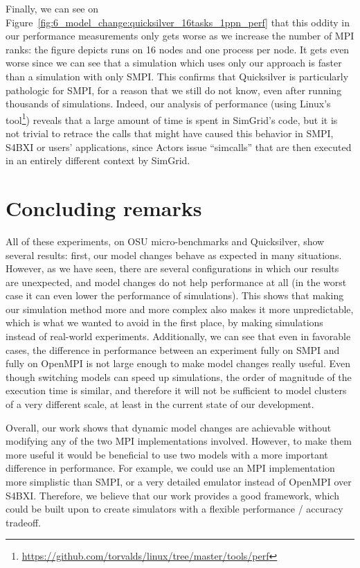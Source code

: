 Finally, we can see on
Figure~\ref{fig:6_model_change:quicksilver_16tasks_1ppn_perf} that this oddity
in our performance measurements only gets worse as we increase the number of MPI
ranks: the figure depicts runs on 16 nodes and one process per node. It gets
even worse since we can see that a simulation which uses only our approach is
faster than a simulation with only SMPI. This confirms that Quicksilver is
particularly pathologic for SMPI, for a reason that we still do not know, even
after running thousands of simulations. Indeed, our analysis of performance
(using Linux's 
tool\footnote{\url{https://github.com/torvalds/linux/tree/master/tools/perf}})
reveals that a large amount of time is spent in SimGrid's code, but it is not
trivial to retrace the calls that might have caused this behavior in SMPI, S4BXI
or users' applications, since Actors issue ``simcalls'' that are then executed
in an entirely different context by SimGrid.

\section{Concluding remarks}
\label{sec:6_model_change:conclusion}

All of these experiments, on OSU micro-benchmarks and Quicksilver, show several
results: first, our model changes behave as expected in many situations.
However, as we have seen, there are several configurations in which our results
are unexpected, and model changes do not help performance at all (in the worst
case it can even lower the performance of simulations). This shows that making
our simulation method more and more complex also makes it more unpredictable,
which is what we wanted to avoid in the first place, by making simulations
instead of real-world experiments. Additionally, we can see that even in
favorable cases, the difference in performance between an experiment fully on
SMPI and fully on OpenMPI is not large enough to make model changes really
useful. Even though switching models can speed up simulations, the order of
magnitude of the execution time is similar, and therefore it will not be
sufficient to model clusters of a very different scale, at least in the current
state of our development. 

Overall, our work shows that dynamic model changes are achievable without
modifying any of the two MPI implementations involved. However, to make them
more useful it would be beneficial to use two models with a more important
difference in performance. For example, we could use an MPI implementation more
simplistic than SMPI, or a very detailed emulator instead of OpenMPI over S4BXI.
Therefore, we believe that our work provides a good framework, which could be
built upon to create simulators with a flexible performance / accuracy tradeoff.
